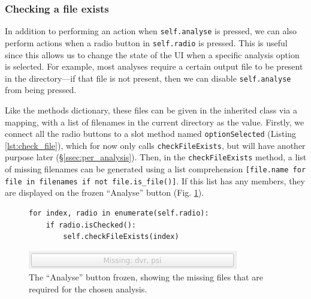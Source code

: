 \documentclass[12pt]{article}
\begin{document}
\subsubsection{Checking a file exists}\label{sssec:check_file}

In addition to performing an action when \texttt{self.analyse} is pressed, we can also perform actions when a radio button in \texttt{self.radio} is pressed. This is useful since this allows us to change the state of the UI when a specific analysis option is selected. For example, most analyses require a certain output file to be present in the directory---if that file is not present, then we can disable \texttt{self.analyse} from being pressed.

Like the methods dictionary, these files can be given in the inherited class via a mapping, with a list of filenames in the current directory as the value. Firstly, we connect all the radio buttons to a slot method named \texttt{optionSelected} (Listing \ref{lst:check_file}), which for now only calls \texttt{checkFileExists}, but will have another purpose later (\S\ref{ssec:per_analysis}). Then, in the \texttt{checkFileExists} method, a list of missing filenames can be generated using a list comprehension \texttt{[file.name for file in filenames if not file.is_file()]}. If this list has any members, they are displayed on the frozen ``Analyse'' button (Fig. \ref{fig:missing_files}).

\begin{figure}[h]
    \centering
    \begin{minipage}[b]{.57\textwidth}
        \begin{verbatim}
for index, radio in enumerate(self.radio):
    if radio.isChecked():
        self.checkFileExists(index)
        \end{verbatim}
        \label{lst:check_file}
    \end{minipage}\hfill\begin{minipage}[b]{.4\textwidth}
        \centering
        \includegraphics[width=\textwidth]{img/missing_files.png}
        \caption{The ``Analyse'' button frozen, showing the missing files that are required for the chosen analysis.}
        \label{fig:missing_files}
    \end{minipage}
\end{figure}
\end{document}

